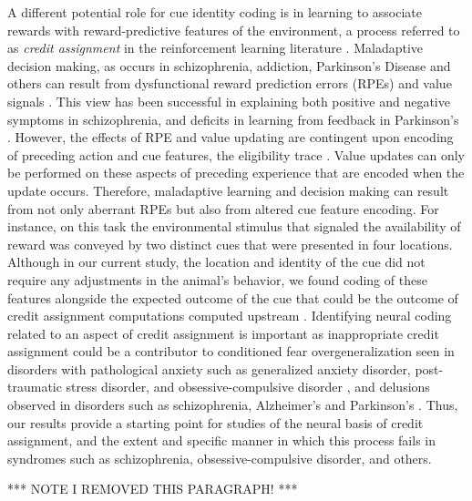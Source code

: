 \documentclass[11pt]{article}
\let\cite=\citep
\begin{document}
A different potential role for cue identity coding is in learning to
associate rewards with reward-predictive features of the environment,
a process referred to as {\it credit assignment} in the reinforcement
learning literature \cite{sutton1998}. Maladaptive decision making, as
occurs in schizophrenia, addiction, Parkinson's Disease and others can
result from dysfunctional reward prediction errors (RPEs) and value
signals \cite{Frank2004,Gradin2011,Maia2011}. This view has been
successful in explaining both positive and negative symptoms in
schizophrenia, and deficits in learning from feedback in Parkinson's
\cite{Frank2004,Gradin2011}. However, the effects of RPE and value
updating are contingent upon encoding of preceding action and cue
features, the eligibility trace \cite{sutton1998,Lee2012}. Value
updates can only be performed on these aspects of preceding experience
that are encoded when the update occurs. Therefore, maladaptive
learning and decision making can result from not only aberrant RPEs
but also from altered cue feature encoding. For instance, on this task
the environmental stimulus that signaled the availability of reward
was conveyed by two distinct cues that were presented in four
locations. Although in our current study, the location and identity of
the cue did not require any adjustments in the animal’s behavior, we
found coding of these features alongside the expected outcome of the
cue that could be the outcome of credit assignment computations
computed upstream
\cite{Chau2015,Akaishi2016,Asaad2017,Noonan2017}. Identifying neural
coding related to an aspect of credit assignment is important as
inappropriate credit assignment could be a contributor to conditioned
fear overgeneralization seen in disorders with pathological anxiety
such as generalized anxiety disorder, post-traumatic stress disorder,
and obsessive-compulsive disorder
\cite{Kaczkurkin2013,Lissek2014,Kaczkurkin2017}, and delusions
observed in disorders such as schizophrenia, Alzheimer's and
Parkinson's \cite{Kapur2003,Corlett2010}. Thus, our results provide a
starting point for studies of the neural basis of credit assignment,
and the extent and specific manner in which this process fails in
syndromes such as schizophrenia, obsessive-compulsive disorder, and
others.

*** NOTE I REMOVED THIS PARAGRAPH! ***
\end{document}
